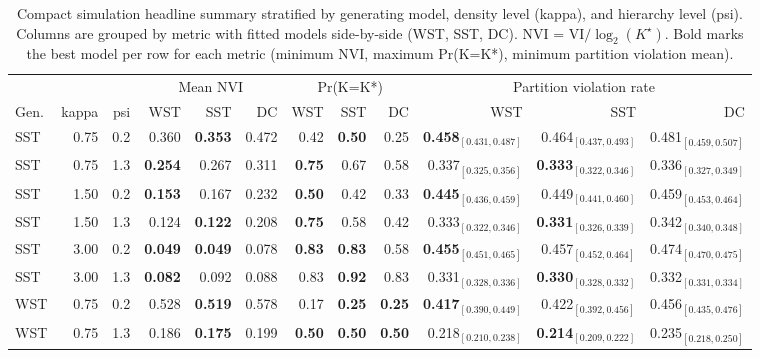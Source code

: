 \begin{table}[!h]
\centering
\caption{Compact simulation headline summary stratified by generating model, density level (kappa), and hierarchy level (psi). Columns are grouped by metric with fitted models side-by-side (WST, SST, DC). NVI = VI$/\log_2(K^\star)$. Bold marks the best model per row for each metric (minimum NVI, maximum Pr(K=K*), minimum partition violation mean).\\\label{tab:sim-headline-compact}}
\centering
\begin{tabular}[t]{lrrrrrrrrrrr}
\toprule
\multicolumn{3}{c}{ } & \multicolumn{3}{c}{Mean NVI} & \multicolumn{3}{c}{Pr(K=K*)} & \multicolumn{3}{c}{Partition violation rate} \\
\cmidrule(l{3pt}r{3pt}){4-6} \cmidrule(l{3pt}r{3pt}){7-9} \cmidrule(l{3pt}r{3pt}){10-12}
Gen. & kappa & psi & WST & SST & DC & WST & SST & DC & WST & SST & DC\\
\midrule
SST & 0.75 & 0.2 & 0.360 & \textbf{0.353} & 0.472 & 0.42 & \textbf{0.50} & 0.25 & \textbf{0.458$_{[0.431,0.487]}$} & 0.464$_{[0.437,0.493]}$ & 0.481$_{[0.459,0.507]}$\\
SST & 0.75 & 1.3 & \textbf{0.254} & 0.267 & 0.311 & \textbf{0.75} & 0.67 & 0.58 & 0.337$_{[0.325,0.356]}$ & \textbf{0.333$_{[0.322,0.346]}$} & 0.336$_{[0.327,0.349]}$\\
SST & 1.50 & 0.2 & \textbf{0.153} & 0.167 & 0.232 & \textbf{0.50} & 0.42 & 0.33 & \textbf{0.445$_{[0.436,0.459]}$} & 0.449$_{[0.441,0.460]}$ & 0.459$_{[0.453,0.464]}$\\
SST & 1.50 & 1.3 & 0.124 & \textbf{0.122} & 0.208 & \textbf{0.75} & 0.58 & 0.42 & 0.333$_{[0.322,0.346]}$ & \textbf{0.331$_{[0.326,0.339]}$} & 0.342$_{[0.340,0.348]}$\\
SST & 3.00 & 0.2 & \textbf{0.049} & \textbf{0.049} & 0.078 & \textbf{0.83} & \textbf{0.83} & 0.58 & \textbf{0.455$_{[0.451,0.465]}$} & 0.457$_{[0.452,0.464]}$ & 0.474$_{[0.470,0.475]}$\\
SST & 3.00 & 1.3 & \textbf{0.082} & 0.092 & 0.088 & 0.83 & \textbf{0.92} & 0.83 & 0.331$_{[0.328,0.336]}$ & \textbf{0.330$_{[0.328,0.332]}$} & 0.332$_{[0.331,0.334]}$\\
WST & 0.75 & 0.2 & 0.528 & \textbf{0.519} & 0.578 & 0.17 & \textbf{0.25} & \textbf{0.25} & \textbf{0.417$_{[0.390,0.449]}$} & 0.422$_{[0.392,0.456]}$ & 0.456$_{[0.435,0.476]}$\\
WST & 0.75 & 1.3 & 0.186 & \textbf{0.175} & 0.199 & \textbf{0.50} & \textbf{0.50} & \textbf{0.50} & 0.218$_{[0.210,0.238]}$ & \textbf{0.214$_{[0.209,0.222]}$} & 0.235$_{[0.218,0.250]}$\\

\end{tabular}
\end{table}
